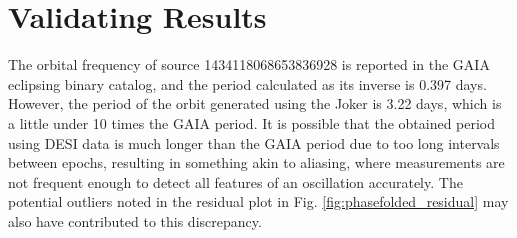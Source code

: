 \documentclass[12pt,a4paper]{article}
\begin{document}
\section{Validating Results}
The orbital frequency of source 1434118068653836928 is reported in the GAIA eclipsing binary catalog, and the period calculated as its inverse is 0.397 days. However, the period of the orbit generated using the Joker is 3.22 days, which is a little under 10 times the GAIA period. It is possible that the obtained period using DESI data is much longer than the GAIA period due to too long intervals between epochs, resulting in something akin to aliasing, where measurements are not frequent enough to detect all features of an oscillation accurately. The potential outliers noted in the residual plot in Fig. \ref{fig:phasefolded_residual} may also have contributed to this discrepancy.
\end{document}

